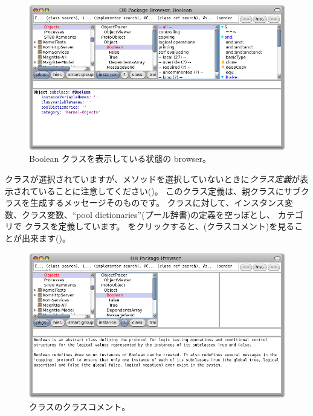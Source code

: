 \documentclass[a4paper,10pt,twoside]{book}
\begin{document}
{\begin{figure}[hbt]
\centerline {\includegraphics[width=\textwidth]{Kernel-objects-boolean}}
\caption{Boolean クラスを表示している状態の browser。
}
\end{figure}

 クラスが選択されていますが、メソッドを選択していないときに\emph{クラス定義}が表示されていることに注意してください()。
このクラス定義は、親クラスにサブクラスを生成するメッセージそのものです。
 クラスに対して、インスタンス変数、クラス変数、``pool dictionaries''(プール辞書)の定義を空っぽとし、 カテゴリで  クラスを定義しています。
 をクリックすると、(クラスコメント)を見ることが出来ます()。

\begin{figure}[hbt]
\centerline {\includegraphics[width=\textwidth]{classComment}}
\caption{ クラスのクラスコメント。
}
\end{figure}

}
\end{document}
